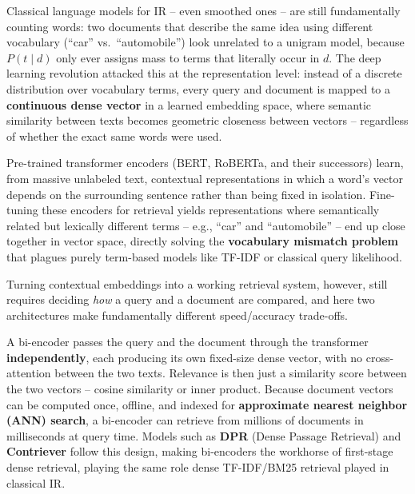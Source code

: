 \documentclass[11pt, a4paper]{article}
\begin{document}
Classical language models for IR -- even smoothed ones -- are still fundamentally counting words: two documents that describe the same idea using different vocabulary (``car'' vs.\ ``automobile'') look unrelated to a unigram model, because $P(t\mid d)$ only ever assigns mass to terms that literally occur in $d$. The deep learning revolution attacked this at the representation level: instead of a discrete distribution over vocabulary terms, every query and document is mapped to a \textbf{continuous dense vector} in a learned embedding space, where semantic similarity between texts becomes geometric closeness between vectors -- regardless of whether the exact same words were used.

\begin{defbox}
Pre-trained transformer encoders (BERT, RoBERTa, and their successors) learn, from massive unlabeled text, contextual representations in which a word's vector depends on the surrounding sentence rather than being fixed in isolation. Fine-tuning these encoders for retrieval yields representations where semantically related but lexically different terms -- e.g., ``car'' and ``automobile'' -- end up close together in vector space, directly solving the \textbf{vocabulary mismatch problem} that plagues purely term-based models like TF-IDF or classical query likelihood.
\end{defbox}

Turning contextual embeddings into a working retrieval system, however, still requires deciding \emph{how} a query and a document are compared, and here two architectures make fundamentally different speed/accuracy trade-offs.

\begin{defbox}
A bi-encoder passes the query and the document through the transformer \textbf{independently}, each producing its own fixed-size dense vector, with no cross-attention between the two texts. Relevance is then just a similarity score between the two vectors -- cosine similarity or inner product. Because document vectors can be computed once, offline, and indexed for \textbf{approximate nearest neighbor (ANN) search}, a bi-encoder can retrieve from millions of documents in milliseconds at query time. Models such as \textbf{DPR} (Dense Passage Retrieval) and \textbf{Contriever} follow this design, making bi-encoders the workhorse of first-stage dense retrieval, playing the same role dense TF-IDF/BM25 retrieval played in classical IR.
\end{defbox}
\end{document}
